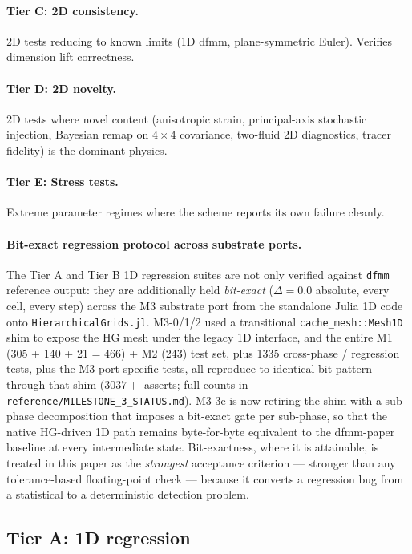 \documentclass[11pt]{article}
\begin{document}
\paragraph{Tier C: 2D consistency.} 2D tests reducing to known limits
(1D dfmm, plane-symmetric Euler). Verifies dimension lift correctness.

\paragraph{Tier D: 2D novelty.} 2D tests where novel content (anisotropic
strain, principal-axis stochastic injection, Bayesian remap on
$4\times 4$ covariance, two-fluid 2D diagnostics, tracer fidelity)
is the dominant physics.

\paragraph{Tier E: Stress tests.} Extreme parameter regimes where
the scheme reports its own failure cleanly.

\paragraph{Bit-exact regression protocol across substrate ports.}
The Tier A and Tier B 1D regression suites are not only verified
against \texttt{dfmm} reference output: they are additionally
held \emph{bit-exact} ($\Delta = 0.0$ absolute, every cell, every
step) across the M3 substrate port from the standalone Julia
1D code onto \texttt{HierarchicalGrids.jl}. M3-0/1/2 used a
transitional \texttt{cache\_mesh::Mesh1D} shim to expose the HG
mesh under the legacy 1D interface, and the entire M1 (305 +
140 + 21 = 466) + M2 (243) test set, plus 1335 cross-phase /
regression tests, plus the M3-port-specific tests, all reproduce
to identical bit pattern through that shim ($3037+$ asserts; full
counts in \verb|reference/MILESTONE_3_STATUS.md|). M3-3e is now
retiring the shim with a sub-phase decomposition that imposes a
bit-exact gate per sub-phase, so that the native HG-driven 1D
path remains byte-for-byte equivalent to the dfmm-paper baseline
at every intermediate state. Bit-exactness, where it is
attainable, is treated in this paper as the \emph{strongest}
acceptance criterion --- stronger than any tolerance-based
floating-point check --- because it converts a regression bug
from a statistical to a deterministic detection problem.

\subsection{Tier A: 1D regression}
\label{sec:tier-A}
\end{document}
